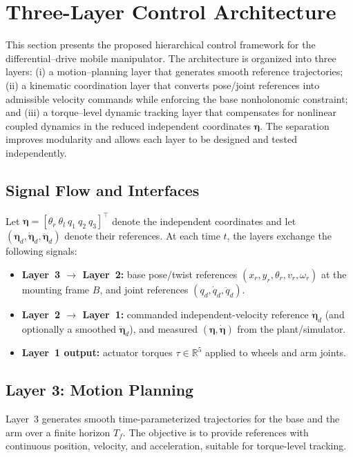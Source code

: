 \documentclass[conference]{IEEEtran}
\newcommand{\etav}{\bm{\eta}}
\begin{document}
\section{Three-Layer Control Architecture}
\label{sec:three_layer_arch}

This section presents the proposed hierarchical control framework for the
differential--drive mobile manipulator. The architecture is organized into
three layers: (i) a motion--planning layer that generates smooth reference
trajectories; (ii) a kinematic coordination layer that converts pose/joint
references into admissible velocity commands while enforcing the base
nonholonomic constraint; and (iii) a torque--level dynamic tracking layer that
compensates for nonlinear coupled dynamics in the reduced independent
coordinates $\etav$. The separation improves modularity and allows each layer
to be designed and tested independently.

\subsection{Signal Flow and Interfaces}
\label{subsec:signals_interfaces}

Let $\etav=[\theta_r~\theta_l~q_1~q_2~q_3]^\top$ denote the independent
coordinates and let $(\etav_d,\dot{\etav}_d,\ddot{\etav}_d)$ denote their
references. At each time $t$, the layers exchange the following signals:
\begin{itemize}
  \item \textbf{Layer~3 $\rightarrow$ Layer~2:} base pose/twist references
  $(x_r,y_r,\theta_r,v_r,\omega_r)$ at the mounting frame $B$, and joint
  references $(q_d,\dot q_d,\ddot q_d)$.
  \item \textbf{Layer~2 $\rightarrow$ Layer~1:} commanded independent-velocity
  reference $\dot{\etav}_d$ (and optionally a smoothed $\ddot{\etav}_d$), and
  measured $(\etav,\dot{\etav})$ from the plant/simulator.
  \item \textbf{Layer~1 output:} actuator torques $\tau\in\mathbb{R}^5$ applied
  to wheels and arm joints.
\end{itemize}

\subsection{Layer 3: Motion Planning}
\label{subsec:layer3_planning}

Layer~3 generates smooth time-parameterized trajectories for the base and the
arm over a finite horizon $T_f$. The objective is to provide references with
continuous position, velocity, and acceleration, suitable for torque-level
tracking.
\end{document}
